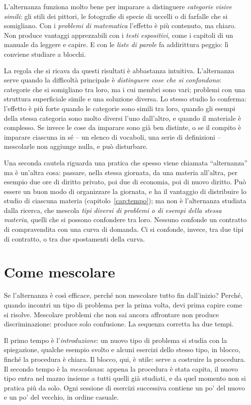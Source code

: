 L'alternanza funziona molto bene per imparare a distinguere
\emph{categorie visive simili}: gli stili dei pittori, le fotografie di
specie di uccelli o di farfalle che si somigliano. Con i \emph{problemi di matematica} l'effetto è più
contenuto, ma chiaro. Non produce vantaggi
apprezzabili con i \emph{testi espositivi}, come i capitoli di un
manuale da leggere e capire. E con le \emph{liste di parole} fa
addirittura peggio: lì conviene studiare a blocchi.

La regola che si ricava da questi risultati è abbastanza intuitiva.
L'alternanza serve quando la difficoltà principale è \emph{distinguere
cose che si confondono}: categorie che si somigliano tra loro, ma i cui
membri sono vari; problemi con una struttura superficiale simile e una
soluzione diversa. Lo stesso studio lo conferma: l'effetto è più forte
quando le categorie sono simili tra loro, quando gli esempi della stessa
categoria sono molto diversi l'uno dall'altro, e quando il materiale è
complesso. Se invece le cose da imparare sono già ben distinte, o se il
compito è imparare ciascuna in sé -- un elenco di vocaboli, una serie
di definizioni -- mescolarle non aggiunge nulla, e può disturbare.

Una seconda cautela riguarda una pratica che spesso viene chiamata
\enquote{alternanza} ma è un'altra cosa: passare, nella stessa
giornata, da una materia all'altra, per esempio due ore di diritto
privato, poi due di economia, poi di nuovo diritto. Può essere un
buon modo di organizzare la giornata, e ha il vantaggio di distribuire
lo studio di ciascuna materia (capitolo~\ref{cap:tempo}); ma non è
l'alternanza studiata dalla ricerca, che mescola \emph{tipi diversi di
problemi o di esempi della stessa materia}, quelli che si possono
confondere tra loro. Nessuno confonde un contratto di compravendita
con una curva di domanda. Ci si confonde, invece, tra due tipi di
contratto, o tra due spostamenti della curva.

\section{Come mescolare}

Se l'alternanza è così efficace, perché non mescolare tutto fin
dall'inizio? Perché, quando incontri un tipo di problema per la prima
volta, devi prima capire come si risolve. Mescolare problemi che non
sai ancora affrontare non produce discriminazione: produce solo
confusione. La sequenza corretta ha due tempi.

Il primo tempo è l'\emph{introduzione}: un nuovo tipo di problema si
studia con la spiegazione, qualche esempio svolto e alcuni esercizi
dello stesso tipo, in blocco, finché la procedura è chiara. Il blocco,
qui, è utile: serve a costruire la procedura. Il secondo tempo è la
\emph{mescolanza}: appena la procedura è stata capita, il nuovo tipo
entra nel mazzo insieme a tutti quelli già studiati, e da quel momento
non si pratica più da solo. Ogni sessione di esercizi successiva
contiene un po' del nuovo e un po' del vecchio, in ordine casuale.

